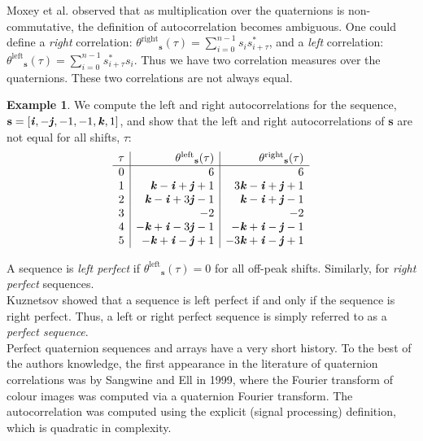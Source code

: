 \documentclass[12pt]{article}
\theoremstyle{definition}
\newtheorem{example}[theorem]{Example}
\begin{document}
Moxey et al.\cite{Moxey2002} observed that as multiplication over the quaternions is 
non-commutative, the definition of autocorrelation becomes ambiguous. One could define a 
\textit{right} correlation: ${\theta^{\text{right}}}_{\textbf{s}}(\tau) = 
\sum\limits_{i=0}^{n-1}s_{i} s_{i+\tau}^*$, and a \textit{left} correlation: ${\theta^{\text{left}}}_{\textbf{s}}(\tau) = 
\sum\limits_{i=0}^{n-1}s_{i+\tau}^* s_{i}$. Thus we have two correlation measures over the
quaternions. These two correlations are not always equal. 

\begin{example}
We compute the left and right autocorrelations for the sequence, $\textbf{s} = [\textbf{\textit{i}},-\textbf{\textit{j}},-1,-1,\textbf{\textit{k}},1]$, and
show that the left and right autocorrelations of \textbf{s} are not equal for all shifts, $\tau$: 
\[
\begin{array}{c|r|r}
\tau & {\theta^{\text{left}}}_{\textbf{s}}(\tau) & {\theta^{\text{right}}}_{\textbf{s}}(\tau) \\
\hline
0 & 6 & 6\\
1 & \textbf{\textit{k}} - \textbf{\textit{i}} + \textbf{\textit{j}} + 1 & 3\textbf{\textit{k}} - \textbf{\textit{i}} +\textbf{\textit{j}} + 1\\
2 & \textbf{\textit{k}} - \textbf{\textit{i}} + 3\textbf{\textit{j}} - 1 & \textbf{\textit{k}} - \textbf{\textit{i}} + \textbf{\textit{j}} - 1\\
3 & -2 & -2\\
4 & -\textbf{\textit{k}} + \textbf{\textit{i}} -3\textbf{\textit{j}} -1 & -\textbf{\textit{k}} + \textbf{\textit{i}}-\textbf{\textit{j}} -1\\
5 & -\textbf{\textit{k}} + \textbf{\textit{i}} - \textbf{\textit{j}} + 1 & -3\textbf{\textit{k}}+\textbf{\textit{i}}-\textbf{\textit{j}}+1
\end{array}\]
\end{example}

A sequence is \textit{left perfect} if ${\theta^{\text{left}}}_{\textbf{s}}(\tau) = 0$ for all 
off-peak shifts. Similarly, for \textit{right perfect} sequences. \\

Kuznetsov\cite{Kuznetsov2010} showed that a sequence is left perfect if and only if the 
sequence is right perfect. Thus, a left or right
perfect sequence is simply referred to as a \textit{perfect sequence}. \\

Perfect quaternion sequences and arrays have a very short history. To the best of 
the authors knowledge, the first appearance in the literature of quaternion 
correlations was by Sangwine and Ell\cite{Sangwine1999} in 1999, where the Fourier
transform of colour images was computed via a quaternion Fourier transform. The autocorrelation was 
computed using the explicit (signal processing) definition, which is quadratic in complexity. \\ 
\end{document}
